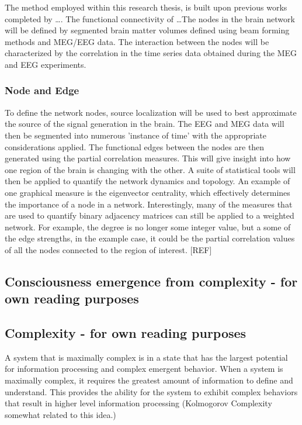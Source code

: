 \documentclass{article}
\begin{document}
The method employed within this research thesis, is built upon previous works completed by \dots. The functional connectivity of \dots The nodes in the brain network will be defined by segmented brain matter volumes defined using beam forming methods and MEG/EEG data. The interaction between the nodes will be characterized by the correlation in the time series data obtained during the MEG and EEG experiments.

\subsubsection*{Node and Edge}
To define the network nodes, source localization will be used to best approximate the source of the signal generation in the brain. The EEG and MEG data will then be segmented into numerous 'instance of time' with the appropriate considerations applied. The functional edges between the nodes are then generated using the partial correlation measures. This will give insight into how one region of the brain is changing with the other. A suite of statistical tools will then be applied to quantify the network dynamics and topology. An example of one graphical measure is the eigenvector centrality, which effectively determines the importance of a node in a network. Interestingly, many of the measures that are used to quantify binary adjacency matrices can still be applied to a weighted network. For example, the degree is no longer some  integer value, but a some of the edge strengths, in the example case, it could be the partial correlation values of all the nodes connected to the region of interest. [REF]

\subsection{Consciousness emergence from complexity - for own reading purposes}

\subsection{Complexity - for own reading purposes}
A system that is maximally complex is in a state that has the largest potential for information processing and complex emergent behavior. When a system is maximally complex, it requires the greatest amount of information to define and understand. This provides the ability for the system to exhibit complex behaviors that result in higher level information processing (Kolmogorov Complexity somewhat related to this idea.)
\end{document}
